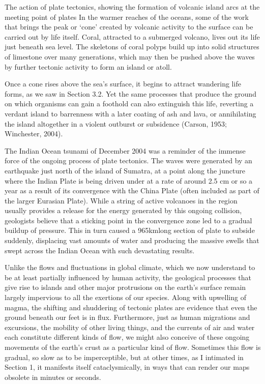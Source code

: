\documentclass[letterpaper,10pt,english]{sphinxmanual}
\begin{document}
The action of plate tectonics, showing the formation of volcanic island arcs at the meeting point of plates In the warmer reaches of the oceans, some of the work that brings the peak or ‘cone’ created by volcanic activity to the surface can be carried out by life itself. Coral, attracted to a submerged volcano, lives out its life just beneath sea level. The skeletons of coral polyps build up into solid structures of limestone over many generations, which may then be pushed above the waves by
further tectonic activity to form an island or atoll.

Once a cone rises above the sea’s surface, it begins to attract wandering life forms, as we saw in Section 3.2. Yet the same processes that produce the ground on which organisms can gain a foothold can also extinguish this life, reverting a verdant island to barrenness with a later coating of ash and lava, or annihilating the island altogether in a violent outburst or subsidence (Carson, 1953; Winchester, 2004).

The Indian Ocean tsunami of December 2004 was a reminder of the immense force of the ongoing process of plate tectonics. The waves were generated by an earthquake just north of the island of Sumatra, at a point along the juncture where the Indian Plate is being driven under at a rate of around 2.5 cm or so a year as a result of its convergence with the China Plate (often included as part of the larger Eurasian Plate). While a string of active volcanoes in the region usually provides a release
for the energy generated by this ongoing collision, geologists believe that a sticking point in the convergence zone led to a gradual build\sphinxhyphen{}up of pressure. This in turn caused a 965\sphinxhyphen{}km\sphinxhyphen{}long section of plate to subside suddenly, displacing vast amounts of water and producing the massive swells that swept across the Indian Ocean with such devastating results.

Unlike the flows and fluctuations in global climate, which we now understand to be at least partially influenced by human activity, the geological processes that give rise to islands and other major protrusions on the earth’s surface remain largely impervious to all the exertions of our species. Along with upwelling of magma, the shifting and shuddering of tectonic plates are evidence that even the ground beneath our feet is in flux. Furthermore, just as human migrations and excursions, the
mobility of other living things, and the currents of air and water each constitute different kinds of flow, we might also conceive of these ongoing movements of the earth’s crust as a particular kind of flow. Sometimes this flow is gradual, so slow as to be imperceptible, but at other times, as I intimated in Section 1, it manifests itself cataclysmically, in ways that can render our maps obsolete in minutes or seconds.
\end{document}
